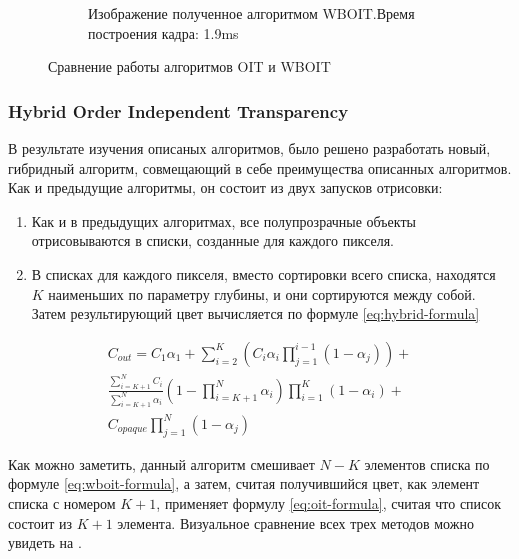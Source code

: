 \begin{figure}[!htbp]
\begin{subfigure}[b]{0.3\textwidth}
					\caption{Изображение полученное алгоритмом WBOIT.\linebreak Время построения кадра: 1.9ms}
					\label{fig:wboit_flower}
				\end{subfigure}				
				\captionsetup{justification=centering} %
				\caption{Сравнение работы алгоритмов OIT и WBOIT}\label{fig:oit_vs_wboit} 
			\end{figure}
			
		\subsubsection{Hybrid Order Independent Transparency} \label{ch3:render_pass:transparents:hybrid_oit}
			В результате изучения описаных алгоритмов, было решено разработать новый, гибридный алгоритм, совмещающий в себе преимущества описанных алгоритмов. Как и предыдущие алгоритмы, он состоит из двух запусков отрисовки:
			
			\begin{enumerate}[1.]
				\item Как и в предыдущих алгоритмах, все полупрозрачные объекты отрисовываются в списки, созданные для каждого пикселя.
				\item В списках для каждого пикселя, вместо сортировки всего списка, находятся $K$ наименьших по параметру глубины, и они сортируются между собой. Затем результирующий цвет вычисляется по формуле \ref{eq:hybrid-formula}
			\end{enumerate}
			
			\begin{equation}
				\label{eq:hybrid-formula}
				\begin{multlined}	 
					C_{out} = C_{1}\alpha_1 +
					\sum_{i=2}^{K}(C_i\alpha_i\prod _{j=1}^{i - 1}(1 - \alpha_j)) + \\
					\frac{\sum_{i=K+1}^{N}C_i}{\sum_{i=K+1}^{N}\alpha_i}(1 - \prod_{i=K+1}^{N}\alpha_i)\prod _{i=1}^{K}(1 - \alpha_i) + \\	
					C_{opaque}\prod _{j=1}^{N}(1 - \alpha_j)   
				\end{multlined}
			\end{equation}
			
			Как можно заметить, данный алгоритм смешивает $N-K$ элементов списка по формуле \ref{eq:wboit-formula}, а затем, считая получившийся цвет, как элемент списка с номером $K+1$, применяет формулу \ref{eq:oit-formula}, считая что список состоит из $K+1$ элемента. Визуальное сравнение всех трех методов можно увидеть на .
		
